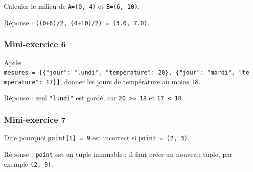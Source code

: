 Calculer le milieu de \texttt{A=(0,\ 4)} et \texttt{B=(6,\ 10)}.

Réponse : \texttt{((0+6)/2,\ (4+10)/2)\ =\ (3.0,\ 7.0)}.

\subsubsection{Mini-exercice 6}

Après
\texttt{mesures\ =\ {[}\{"jour":\ "lundi",\ "température":\ 20\},\ \{"jour":\ "mardi",\ "température":\ 17\}{]}},
donner les jours de température au moins 18.

Réponse : seul \texttt{"lundi"} est gardé, car
\texttt{20\ \textgreater{}=\ 18} et \texttt{17\ \textless{}\ 18}.

\subsubsection{Mini-exercice 7}

Dire pourquoi \texttt{point{[}1{]}\ =\ 9} est incorrect si
\texttt{point\ =\ (2,\ 3)}.

Réponse : \texttt{point} est un tuple immuable ; il faut créer un
nouveau tuple, par exemple \texttt{(2,\ 9)}.
